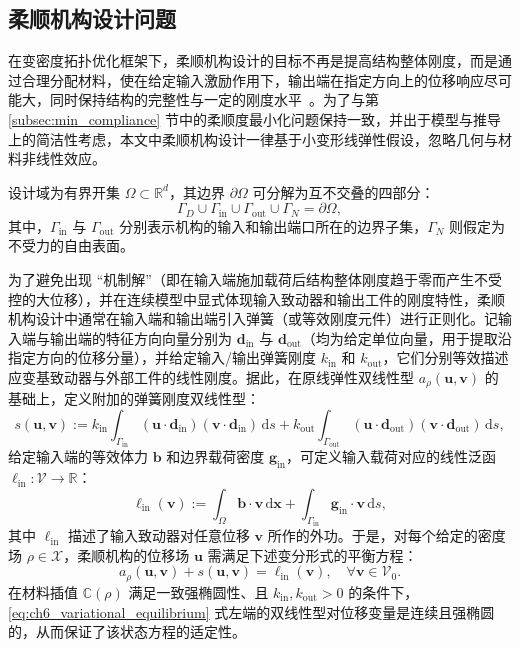 \subsection{柔顺机构设计问题}
\label{subsec:compliant_mechanisms}

在变密度拓扑优化框架下，柔顺机构设计的目标不再是提高结构整体刚度，而是通过合理分配材料，使在给定输入激励作用下，输出端在指定方向上的位移响应尽可能大，同时保持结构的完整性与一定的刚度水平~\cite{bendsoeTopologyOptimization2004a}。为了与第 \ref{subsec:min_compliance} 节中的柔顺度最小化问题保持一致，并出于模型与推导上的简洁性考虑，本文中柔顺机构设计一律基于小变形线弹性假设，忽略几何与材料非线性效应。

设计域为有界开集 $\Omega\subset\mathbb{R}^d$，其边界 $\partial\Omega$ 可分解为互不交叠的四部分：
\[
\Gamma_D \cup \Gamma_{\mathrm{in}} \cup \Gamma_{\mathrm{out}} \cup \Gamma_N = \partial\Omega,
\]
其中，$\Gamma_{\mathrm{in}}$ 与 $\Gamma_{\mathrm{out}}$ 分别表示机构的输入和输出端口所在的边界子集，$\Gamma_N$ 则假定为不受力的自由表面。

为了避免出现 “机制解”（即在输入端施加载荷后结构整体刚度趋于零而产生不受控的大位移），并在连续模型中显式体现输入致动器和输出工件的刚度特性，柔顺机构设计中通常在输入端和输出端引入弹簧（或等效刚度元件）进行正则化。记输入端与输出端的特征方向向量分别为 $\boldsymbol{d}_{\mathrm{in}}$ 与 $\boldsymbol{d}_{\mathrm{out}}$（均为给定单位向量，用于提取沿指定方向的位移分量），并给定输入/输出弹簧刚度 $k_{\mathrm{in}}$ 和 $k_{\mathrm{out}}$，它们分别等效描述应变基致动器与外部工件的线性刚度。据此，在原线弹性双线性型 $a_\rho(\boldsymbol{u},\boldsymbol{v})$ 的基础上，定义附加的弹簧刚度双线性型：
\[
s(\boldsymbol{u},\boldsymbol{v}) := k_{\mathrm{in}}\int_{\Gamma_{\mathrm{in}}}(\boldsymbol{u}\cdot\boldsymbol{d}_{\mathrm{in}})(\boldsymbol{v}\cdot\boldsymbol{d}_{\mathrm{in}})\,\mathrm{d}s + k_{\mathrm{out}}\int_{\Gamma_{\mathrm{out}}}(\boldsymbol{u}\cdot\boldsymbol{d}_{\mathrm{out}})(\boldsymbol{v}\cdot\boldsymbol{d}_{\mathrm{out}})\,\mathrm{d}s,
\]
给定输入端的等效体力 $\boldsymbol{b}$ 和边界载荷密度 $\boldsymbol{g}_{\mathrm{in}}$，可定义输入载荷对应的线性泛函 $\ell_{\mathrm{in}}:\mathcal{V}\to\mathbb{R}$：
\[
\ell_{\mathrm{in}}(\boldsymbol{v}) := \int_{\Omega}\boldsymbol{b}\cdot\boldsymbol{v}\,\mathrm{d}\boldsymbol{x} + \int_{\Gamma_{\mathrm{in}}}\boldsymbol{g}_{\mathrm{in}}\cdot\boldsymbol{v}\,\mathrm{d}s,
\]
其中 $\ell_{\mathrm{in}}$ 描述了输入致动器对任意位移 $\boldsymbol{v}$ 所作的外功。于是，对每个给定的密度场 $\rho\in\mathcal{X}$，柔顺机构的位移场 $\boldsymbol{u}$ 需满足下述变分形式的平衡方程：
\begin{equation} 
	a_\rho(\boldsymbol{u},\boldsymbol{v}) + s(\boldsymbol{u},\boldsymbol{v}) = \ell_{\mathrm{in}}(\boldsymbol{v}),\quad \forall \boldsymbol{v}\in\mathcal{V}_0.
	\label{eq:ch6_variational_equilibrium}
\end{equation}
在材料插值 $\mathbb{C}(\rho)$ 满足一致强椭圆性、且 $k_{\mathrm{in}},k_{\mathrm{out}}>0$ 的条件下，\eqref{eq:ch6_variational_equilibrium} 式左端的双线性型对位移变量是连续且强椭圆的，从而保证了该状态方程的适定性。

